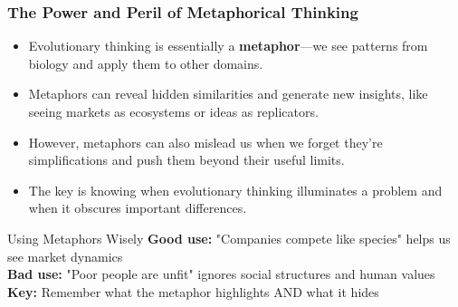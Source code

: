 \documentclass{beamer}
\begin{document}
	\begin{frame}
		\frametitle{The Power and Peril of Metaphorical Thinking}
		\begin{itemize}
			\item Evolutionary thinking is essentially a \textbf{metaphor}—we see patterns from biology and apply them to other domains.
			\item Metaphors can reveal hidden similarities and generate new insights, like seeing markets as ecosystems or ideas as replicators.
			\item However, metaphors can also mislead us when we forget they're simplifications and push them beyond their useful limits.
			\item The key is knowing when evolutionary thinking illuminates a problem and when it obscures important differences.
		\end{itemize}
		\begin{block}{Using Metaphors Wisely}
			\textbf{Good use:} "Companies compete like species" helps us see market dynamics\\
			\textbf{Bad use:} "Poor people are unfit" ignores social structures and human values\\
			\textbf{Key:} Remember what the metaphor highlights AND what it hides
		\end{block}
	\end{frame}
	
\end{document}
